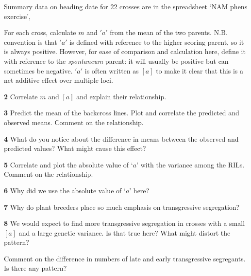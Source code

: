 \documentclass[
]{book}
\makeatletter
\newenvironment{kframe}{%
\medskip{}
\setlength{\fboxsep}{.8em}
 \def\at@end@of@kframe{}%
 \ifinner\ifhmode%
  \def\at@end@of@kframe{\end{minipage}}%
  \begin{minipage}{\columnwidth}%
 \fi\fi%
 \def\FrameCommand##1{\hskip\@totalleftmargin \hskip-\fboxsep
 \colorbox{shadecolor}{##1}\hskip-\fboxsep
     \hskip-\linewidth \hskip-\@totalleftmargin \hskip\columnwidth}%
 \MakeFramed {\advance\hsize-\width
   \@totalleftmargin\z@ \linewidth\hsize
   \@setminipage}}%
 {\par\unskip\endMakeFramed%
 \at@end@of@kframe}
\newenvironment{rmdblock}[1]
  {
  \begin{itemize}
  \renewcommand{\labelitemi}{
    \raisebox{-.7\height}[0pt][0pt]{
      {\setkeys{Gin}{width=3em,keepaspectratio}\texttt{[image: images/\#1]}}
    }
  }
  \setlength{\fboxsep}{1em}
  \begin{kframe}
  \item
  }
  {
  \end{kframe}
  \end{itemize}
  }
\newenvironment{rmdquiz}
  {\begin{rmdblock}{quiz}}
  {\end{rmdblock}}
\makeatother
\begin{document}
Summary data on heading date for 22 crosses are in the spreadsheet `NAM phens exercise',

For each cross, calculate \(m\) and \('a'\) from the mean of the two parents. N.B. convention is that \('a'\) is defined with reference to the higher scoring parent, so it is always positive. However, for ease of comparison and calculation here, define it with reference to the \emph{spontaneum} parent: it will usually be positive but can sometimes be negative. \('a'\) is often written as \([a]\) to make it clear that this is a net additive effect over multiple loci.

\begin{rmdquiz}
\textbf{2}
Correlate \(m\) and \([a]\) and explain their relationship.
\end{rmdquiz}

\begin{rmdquiz}
\textbf{3}
Predict the mean of the backcross lines. Plot and correlate the predicted and observed means. Comment on the relationship.
\end{rmdquiz}

\begin{rmdquiz}
\textbf{4}
What do you notice about the difference in means between the observed and predicted values? What might cause this effect?
\end{rmdquiz}

\begin{rmdquiz}
\textbf{5}
Correlate and plot the absolute value of \(‘a’\) with the variance among the RILs.
Comment on the relationship.
\end{rmdquiz}

\begin{rmdquiz}
\textbf{6}
Why did we use the absolute value of \(‘a’\) here?
\end{rmdquiz}

\begin{rmdquiz}
\textbf{7}
Why do plant breeders place so much emphasis on transgressive segregation?
\end{rmdquiz}

\begin{rmdquiz}
\textbf{8}
We would expect to find more transgressive segregation in crosses with a small \([a]\) and a large genetic variance. Is that true here? What might distort the pattern?
\end{rmdquiz}

Comment on the difference in numbers of late and early transgressive segregants. Is there any pattern?
\end{document}

